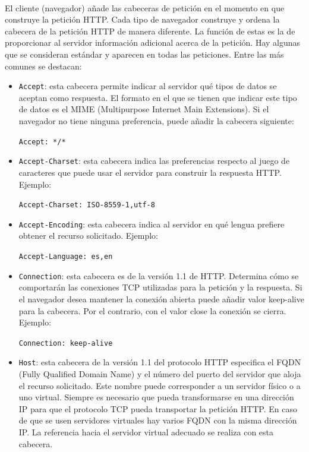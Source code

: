 \documentclass{article}
\begin{document}
	\paragraph{}El cliente (navegador) añade las cabeceras de petición en el momento en que construye la petición HTTP. Cada tipo de navegador construye y ordena la cabecera de la petición HTTP de manera diferente. La función de estas es la de proporcionar al servidor información adicional acerca de la petición. Hay algunas que se consideran estándar y aparecen en todas las peticiones. Entre las más comunes se destacan:
	
	\begin{itemize}
		\item \texttt{Accept}: esta cabecera permite indicar al servidor qué tipos de datos se aceptan como respuesta. El formato en el que se tienen que indicar este tipo de datos es el MIME (Multipurpose Internet Main Extensions). Si el navegador no tiene ninguna preferencia, puede añadir la cabecera siguiente:
		\begin{center}
			\texttt{Accept: */*}
		\end{center}
		\item \texttt{Accept-Charset}: esta cabecera indica las preferencias respecto al juego de caracteres que puede usar el servidor para construir la respuesta HTTP. Ejemplo:
		\begin{center}
			\texttt{Accept-Charset: ISO-8559-1,utf-8}
		\end{center}
		\item \texttt{Accept-Encoding}: esta cabecera indica al servidor en qué lengua prefiere obtener el recurso solicitado. Ejemplo:
		\begin{center}
			\texttt{Accept-Language: es,en}
		\end{center}
		\item \texttt{Connection}: esta cabecera es de la versión 1.1 de HTTP. Determina cómo se comportarán las conexiones TCP utilizadas para la petición y la respuesta. Si el navegador desea mantener la conexión abierta puede añadir valor keep-alive para la cabecera. Por el contrario, con el valor close la conexión se cierra. Ejemplo:
		\begin{center}
			\texttt{Connection: keep-alive}
		\end{center}
		\item \texttt{Host}: esta cabecera de la versión 1.1 del protocolo HTTP especifica el FQDN (Fully Qualified Domain Name) y el número del puerto del servidor que aloja el recurso solicitado. Este nombre puede corresponder a un servidor físico o a uno virtual. Siempre es necesario que pueda transformarse en una dirección IP para que el protocolo TCP pueda transportar la petición HTTP. En caso de que se usen servidores virtuales hay varios FQDN con la misma dirección IP. La referencia hacia el servidor virtual adecuado se realiza con esta cabecera. 

\end{itemize}
\end{document}
